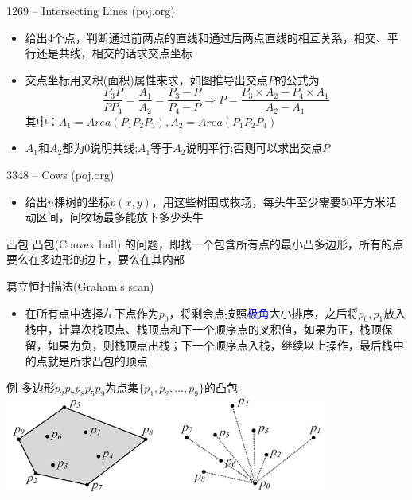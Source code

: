 \begin{frame}{1269 -- Intersecting Lines (poj.org)}
    \begin{itemize}
        \item 给出4个点，判断通过前两点的直线和通过后两点直线的相互关系，相交、平行还是共线，相交的话求交点坐标
        \item 交点坐标用叉积(面积)属性来求，如图推导出交点$P$的公式为
        $$\frac{P_3P}{PP_4}=\frac{A_1}{A_2}=\frac{P_3-P}{P_4-P}\Rightarrow P=\frac{P_3\times A_2-P_4\times A_1}{A_2-A_1}$$
        其中：$A_1=Area(P_1P_2P_3),A_2=Area(P_1P_2P_4)$
        \item $A_1$和$A_2$都为0说明共线;$A_1$等于$A_2$说明平行;否则可以求出交点$P$
    \end{itemize} 
    \begin{center}
    \end{center}
    
\end{frame}
\begin{frame}{3348 -- Cows (poj.org)}
    \begin{itemize}
        \item 给出$n$棵树的坐标$p(x,y)$，用这些树围成牧场，每头牛至少需要50平方米活动区间，问牧场最多能放下多少头牛
    \end{itemize} 
    \vfill
    \begin{block}{凸包}
        凸包(Convex hull) 的问题，即找一个包含所有点的最小凸多边形，所有的点要么在多边形的边上，要么在其内部
    \end{block}
\end{frame}
\begin{frame}{葛立恒扫描法(Graham's scan)}
    \begin{itemize}
        \item 在所有点中选择左下点作为$p_0$，将剩余点按照\textcolor{blue}{极角}大小排序，之后将$p_0,p_1$放入栈中，计算次栈顶点、栈顶点和下一个顺序点的叉积值，如果为正，栈顶保留，如果为负，则栈顶点出栈；下一个顺序点入栈，继续以上操作，最后栈中的点就是所求凸包的顶点
    \end{itemize}
    \begin{exampleblock}{例}
        多边形$p_2p_7p_8p_5p_9$为点集$\{ p_1,p_2,\ldots ,p_9\}$的凸包
        \includegraphics[width=0.8\textwidth,center]{fig/9-7.png}
    \end{exampleblock}
\end{frame}
